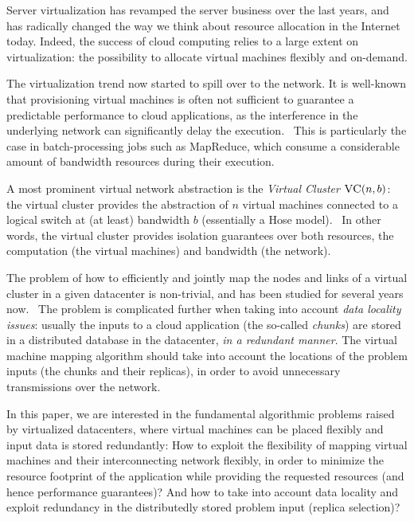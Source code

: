 \documentclass[9pt,twocolumn]{scrartcl}
\newcommand{\VC}{\textsc{VC}}
\begin{document}
Server virtualization has revamped the server business over the last years,
and has radically changed the way we think about resource allocation in the Internet today.
Indeed, the success of cloud computing relies to a large extent on virtualization:
the possibility to allocate virtual machines flexibly and on-demand.

The virtualization trend now started to spill over to the network. It is well-known
that provisioning virtual machines is often not sufficient to guarantee a predictable performance
to cloud applications, as the interference in the underlying network can significantly delay the
execution.~\cite{talk-about} This is particularly the case in batch-processing jobs such as MapReduce, which consume
a considerable amount of bandwidth resources during their execution.~\cite{amazonbw}

A most prominent virtual network abstraction is the \emph{Virtual Cluster} $\VC(n,b)$:
the virtual cluster provides the abstraction of $n$ virtual machines connected to a logical
switch at (at least) bandwidth $b$ (essentially a Hose model).~\cite{oktopus}
In other words, the virtual cluster provides isolation guarantees over both resources,
the computation (the virtual machines) and bandwidth (the network).

The problem of how to efficiently and jointly map the nodes and links of a virtual cluster in a given datacenter is non-trivial,
and has been studied for several years now.~\cite{oktopus,proteus,secondnet} The problem is complicated further when taking into account
\emph{data locality issues}: usually the inputs to a cloud application (the so-called \emph{chunks})
are stored in a
distributed database in the datacenter, \emph{in a redundant manner}. The virtual machine mapping algorithm should take into account
the locations
of the problem inputs (the chunks and their replicas), in order to avoid unnecessary transmissions over the network.

In this paper, we are interested in the fundamental algorithmic problems raised by virtualized datacenters,
where virtual machines can be placed flexibly and input data is stored redundantly:
How to exploit the flexibility of mapping virtual machines and their interconnecting
network flexibly, in order to minimize the resource footprint of the application while providing
the requested resources (and hence performance guarantees)?
And how to take into account data locality and exploit
redundancy in the distributedly stored problem input (replica selection)?
\end{document}
